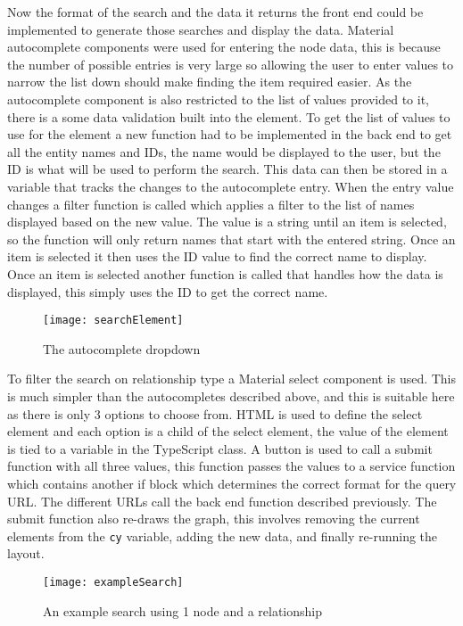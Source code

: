 Now the format of the search and the data it returns the front end could be implemented to generate those searches and display the data.
Material autocomplete components were used for entering the node data, this is because the number of possible entries is very large so allowing the 
user to enter values to narrow the list down should make finding the item required easier. As the autocomplete component is also restricted to the list 
of values provided to it, there is a some data validation built into the element. To get the list of values to use for the element a new function had to be 
implemented in the back end to get all the entity names and IDs, the name would be displayed to the user, but the ID is what will be used to perform the search.
This data can then be stored in a variable that tracks the changes to the autocomplete entry. When the entry value changes a filter function is called which applies 
a filter to the list of names displayed based on the new value. The value is a string until an item is selected, so the function will only return names that start with the entered string. 
Once an item is selected it then uses the ID value to find the correct name to display. Once an item is selected another function is called that handles how the data is displayed,
this simply uses the ID to get the correct name.
\begin{figure}[!htbp]
    \centering
    \texttt{[image: searchElement]}
    \caption{The autocomplete dropdown}
\end{figure}
To filter the search on relationship type a Material select component is used. This is much simpler than the autocompletes described above, and this is 
suitable here as there is only 3 options to choose from. HTML is used to define the select element and each option is a child of the select element, 
the value of the element is tied to a variable in the TypeScript class.
A button is used to call a submit function with all three values, this function passes the values to a service function which contains another if block 
which determines the correct format for the query URL. The different URLs call the back end function described previously.
The submit function also re-draws the graph, this involves removing the current elements from the \verb|cy| variable, adding the new data, and finally re-running 
the layout.
\begin{figure}[!htbp]
    \centering
    \texttt{[image: exampleSearch]}
    \caption{An example search using 1 node and a relationship}
\end{figure}